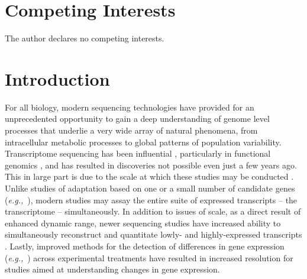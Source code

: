 \documentclass[10pt,letterpaper]{article}
\newcommand{\eg}{\textit{e.g.,}}
\begin{document}
\section*{Competing Interests} The author declares no competing interests.

\section{Introduction}

For all biology, modern sequencing technologies have provided for an unprecedented opportunity to gain a deep understanding of genome level processes that underlie a very wide array of natural phenomena, from intracellular metabolic processes to global patterns of population variability. Transcriptome sequencing has been influential \citep{Mortazavi:2008jj,Wang:2009di}, particularly in functional genomics \citep{Lappalainen:2013el,Cahoy:2008hm}, and has resulted in discoveries not possible even just a few years ago. This in large part is due to the scale at which these studies may be conducted \citep{Li:2017bq, Tan:2017ix}. Unlike studies of adaptation based on one or a small number of candidate genes (\eg\ \citep{Fitzpatrick:2005vd,Panhuis:2006kp}), modern studies may assay the entire suite of expressed transcripts -- the transcriptome -- simultaneously. In addition to issues of scale, as a direct result of enhanced dynamic range, newer sequencing studies have increased ability to simultaneously reconstruct and quantitate lowly- and highly-expressed transcripts \citep{Wolf:2013hd,Vijay:2012gy}. Lastly, improved methods for the detection of differences in gene expression (\eg\ \citep{Robinson:2010cw,Love:2014cf}) across experimental treatments have resulted in increased resolution for studies aimed at understanding changes in gene expression.    \\
\end{document}
